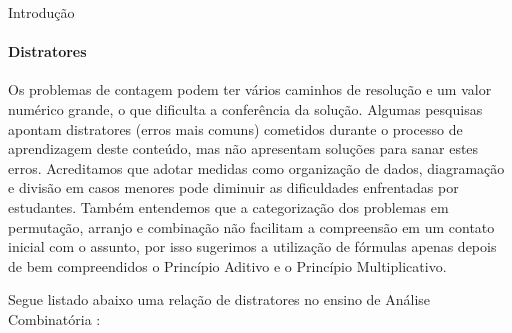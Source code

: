 \begin{apresentacao}{Introdução}
\begin{itemize}
\end{itemize}

\paragraph{Distratores}

Os problemas de contagem podem ter vários caminhos de resolução e um valor numérico grande, o que dificulta a conferência da solução. Algumas pesquisas apontam distratores (erros mais comuns) cometidos durante o processo de aprendizagem deste conteúdo, mas não apresentam soluções para sanar estes erros. Acreditamos que adotar medidas como organização de dados, diagramação  e divisão em casos menores pode diminuir as dificuldades enfrentadas por estudantes. Também entendemos que a categorização dos problemas em permutação, arranjo e combinação não facilitam a compreensão em um contato inicial com o assunto, por isso sugerimos a utilização de fórmulas apenas depois de bem compreendidos o Princípio Aditivo e o Princípio Multiplicativo. 

Segue listado abaixo uma relação de distratores no ensino de Análise Combinatória :



\end{apresentacao}
